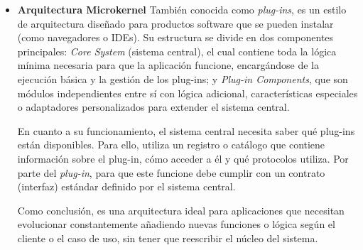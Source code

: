 \begin{itemize}
    Valorando sus características arquitectónicas más relevantes, se clasifican en:

    \begin{itemize}
        \item Costo y simplicidad: es un estilo relativamente económico y fácil de implementar para los casos de uso 
        adecuados.
        \item Facilidad de desarrollo: la separación clara de responsabilidades en filtros independientes facilita 
        mucho el trabajo de codificación.
        \item Escalabilidad: al ser generalmente una arquitectura monolítica, es difícil de escalar de forma elástica.
        \item Tolerancia a fallos: si un filtro o una tubería falla, todo el proceso suele detenerse, lo que lo hace 
        poco resiliente.
    \end{itemize}

    Como conclusión, esta arquitectura es ideal para aplicaciones que requieren un procesamiento de datos secuencial y 
    discreto, como herramientas de procesamiento de texto, compiladores o sistemas de extracción, transformación y 
    carga (ETL) sencillos.

    \item \textbf{Arquitectura Microkernel}
    \newline
    También conocida como \textit{plug-ins}, es un estilo de arquitectura diseñado para productos software que se pueden
    instalar (como navegadores o IDEs). Su estructura se divide en dos componentes principales: \textit{Core System} 
    (sistema central), el cual contiene toda la lógica mínima necesaria para que la aplicación funcione, encargándose de 
    la ejecución básica y la gestión de los plug-ins; y \textit{Plug-in Components}, que son módulos independientes entre sí
    con lógica adicional, características especiales o adaptadores personalizados para extender el sistema central.

    En cuanto a su funcionamiento, el sistema central necesita saber qué plug-ins están disponibles. Para ello, utiliza  
    un registro o catálogo que contiene información sobre el plug-in, cómo acceder a él y qué protocolos utiliza. Por
    parte del \textit{plug-in}, para que este funcione debe cumplir con un contrato (interfaz) estándar definido por 
    el sistema central. 

    Como conclusión, es una arquitectura ideal para aplicaciones que necesitan evolucionar constantemente añadiendo nuevas 
    funciones o lógica según el cliente o el caso de uso, sin tener que reescribir el núcleo del sistema.

\end{itemize}

